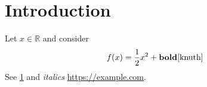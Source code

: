 \documentclass[11pt]{article}
\newcommand{\R}{\mathbb{R}}
\begin{document}
\section{Introduction}\label{sec:intro}
Let $x \in \R$ and consider
\begin{equation}
  f(x) = \frac{1}{2} x^2 + \textbf{bold} \cite{knuth}
\end{equation}
See \ref{sec:intro} and \textit{italics} \url{https://example.com}.
\end{document}
